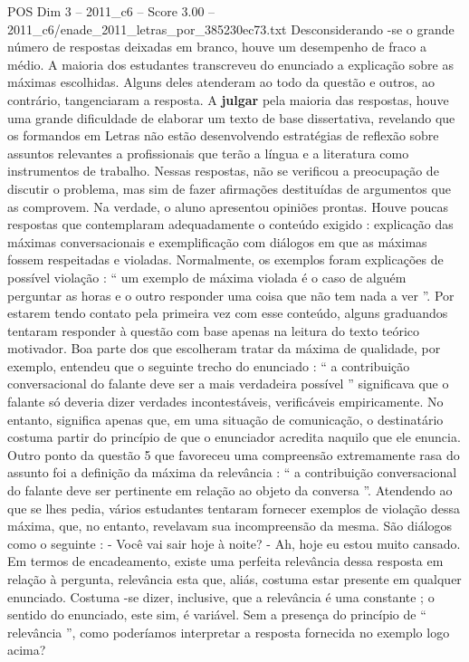 \begin{textsample}{POS Dim 3 – 2011\_c6 – Score 3.00 – 2011\_c6/enade\_2011\_letras\_por\_385230ec73.txt}
Desconsiderando -se o grande número de respostas deixadas em branco, houve um desempenho de fraco a médio.
A maioria dos estudantes transcreveu do enunciado a explicação sobre as máximas escolhidas.
Alguns deles atenderam ao todo da questão e outros, ao contrário, tangenciaram a resposta.
A \textbf{julgar} pela maioria das respostas, houve uma grande dificuldade de elaborar um texto de base dissertativa, revelando que os formandos em Letras não estão desenvolvendo estratégias de reflexão sobre assuntos relevantes a profissionais que terão a língua e a literatura como instrumentos de trabalho.
Nessas respostas, não se verificou a preocupação de discutir o problema, mas sim de fazer afirmações destituídas de argumentos que as comprovem.
Na verdade, o aluno apresentou opiniões prontas.
Houve poucas respostas que contemplaram adequadamente o conteúdo exigido : explicação das máximas conversacionais e exemplificação com diálogos em que as máximas fossem respeitadas e violadas.
Normalmente, os exemplos foram explicações de possível violação : “ um exemplo de máxima violada é o caso de alguém perguntar as horas e o outro responder uma coisa que não tem nada a ver ”.
Por estarem tendo contato pela primeira vez com esse conteúdo, alguns graduandos tentaram responder à questão com base apenas na leitura do texto teórico motivador.
Boa parte dos que escolheram tratar da máxima de qualidade, por exemplo, entendeu que o seguinte trecho do enunciado : “ a contribuição conversacional do falante deve ser a mais verdadeira possível ” significava que o falante só deveria dizer verdades incontestáveis, verificáveis empiricamente.
No entanto, significa apenas que, em uma situação de comunicação, o destinatário costuma partir do princípio de que o enunciador acredita naquilo que ele enuncia.
Outro ponto da questão 5 que favoreceu uma compreensão extremamente rasa do assunto foi a definição da máxima da relevância : “ a contribuição conversacional do falante deve ser pertinente em relação ao objeto da conversa ”.
Atendendo ao que se lhes pedia, vários estudantes tentaram fornecer exemplos de violação dessa máxima, que, no entanto, revelavam sua incompreensão da mesma.
São diálogos como o seguinte : - Você vai sair hoje à noite? - Ah, hoje eu estou muito cansado.
Em termos de encadeamento, existe uma perfeita relevância dessa resposta em relação à pergunta, relevância esta que, aliás, costuma estar presente em qualquer enunciado.
Costuma -se dizer, inclusive, que a relevância é uma constante ; o sentido do enunciado, este sim, é variável.
Sem a presença do princípio de “ relevância ”, como poderíamos interpretar a resposta fornecida no exemplo logo acima?

\end{textsample}
